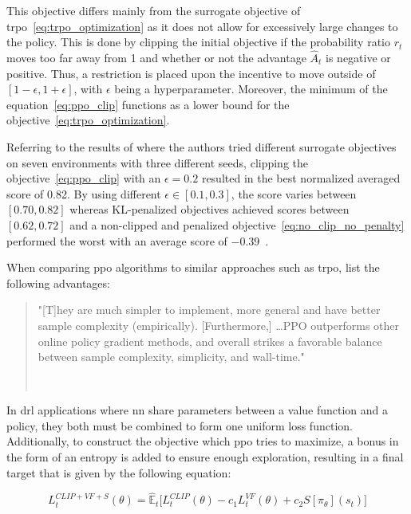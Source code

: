 \documentclass[draft,final]{vutinfth} %
\newcommand{\p}[1]{see p. #1}
\begin{document}
    This objective differs mainly from the surrogate objective of \gls{trpo}~\eqref{eq:trpo_optimization} as it does not allow for excessively large changes to the policy.
    This is done by clipping the initial objective if the probability ratio $r_t$ moves too far away from 1 and whether or not the advantage $\hat{A}_t$ is negative or positive.
    Thus, a restriction is placed upon the incentive to move outside of $[1-\epsilon,1+\epsilon]$, with $\epsilon$ being a hyperparameter.
    Moreover, the minimum of the equation~\ref{eq:ppo_clip} functions as a lower bound for the objective~\ref{eq:trpo_optimization}.

    Referring to the results of \citeauthor{francois-lavet_introduction_2018} where the authors tried different surrogate objectives on seven environments with three different seeds, clipping the objective~\eqref{eq:ppo_clip} with an $\epsilon=0.2$ resulted in the best normalized averaged score of 0.82.
    By using different $\epsilon \in [0.1,0.3]$, the score varies between $[0.70,0.82]$ whereas KL-penalized objectives achieved scores between $[0.62,0.72]$ and a non-clipped and penalized objective~\eqref{eq:no_clip_no_penalty} performed the worst with an average score of $-0.39$~\citep[see Table 1]{francois-lavet_introduction_2018}.

    When comparing \gls{ppo} algorithms to similar approaches such as \gls{trpo}, \citeauthor{francois-lavet_introduction_2018} list the following advantages:

    \begin{quote}
        "[T]hey are much simpler to implement, more general and have better sample complexity (empirically). [Furthermore,] \ldots PPO outperforms other online policy gradient methods, and overall strikes a favorable balance between sample complexity, simplicity, and wall-time."

        \hfill ~\citep[\p{1}]{francois-lavet_introduction_2018}
    \end{quote}

    In \gls{drl} applications where \gls{nn} share parameters between a value function and a policy, they both must be combined to form one uniform loss function.
    Additionally, to construct the objective which \gls{ppo} tries to maximize, a bonus in the form of an entropy is added to ensure enough exploration, resulting in a final target that is given by the following equation:

    \begin{equation}
        L_t^{CLIP+VF+S}(\theta) = \hat{\mathbb{E}}_t\bigg[L_t^{CLIP}(\theta) - c_1L_t^{VF}(\theta) + c_2S[\pi_\theta](s_t)\bigg]\label{eq:ppo_objective}
    \end{equation}
\end{document}
